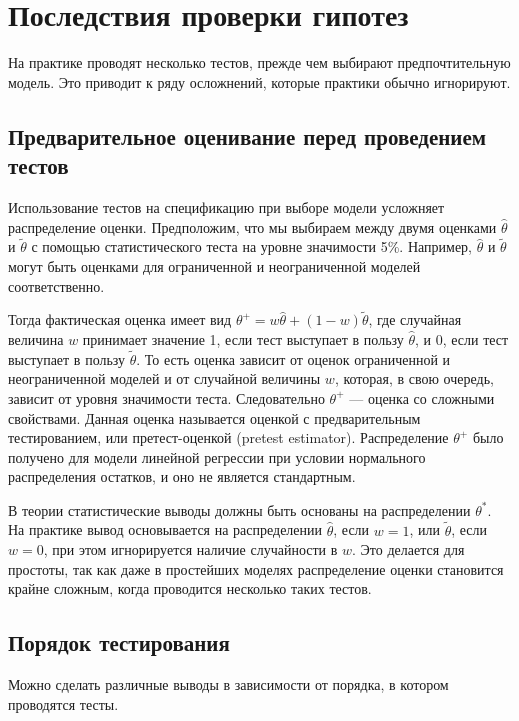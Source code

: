 \section{Последствия проверки гипотез}

На практике проводят несколько тестов, прежде чем выбирают предпочтительную модель. Это приводит к ряду осложнений, которые практики обычно игнорируют.

\subsection{Предварительное оценивание перед проведением тестов}

Использование тестов на спецификацию при выборе модели усложняет распределение оценки. Предположим, что мы выбираем между двумя оценками $\hat{\theta}$ и $\tilde{\theta}$ с помощью статистического теста на уровне значимости 5\%. Например, $\hat{\theta}$ и $\tilde{\theta}$ могут быть оценками для ограниченной и неограниченной моделей соответственно. 

Тогда фактическая оценка имеет вид $\theta^+ = w\hat{\theta} + (1 - w)\tilde{\theta}$, где случайная величина $w$  принимает значение 1, если тест выступает в пользу $\hat{\theta}$, и 0, если тест выступает в пользу $\tilde{\theta}$. То есть оценка зависит от оценок ограниченной и неограниченной моделей и от случайной величины $w$, которая, в свою очередь, зависит от уровня значимости теста. Следовательно $\theta^+$ --- оценка со сложными свойствами. Данная оценка называется оценкой с предварительным тестированием, или претест-оценкой (pretest estimator). Распределение $\theta^+$ было получено для модели линейной регрессии при условии нормального распределения остатков, и оно не является стандартным.

В теории статистические выводы должны быть основаны на распределении $\theta^*$. На практике вывод основывается на распределении $\hat{\theta}$, если $w = 1$, или $\tilde{\theta}$, если $w = 0$, при этом игнорируется наличие случайности в  $w$. Это делается для простоты, так как даже в простейших моделях распределение оценки становится крайне сложным, когда проводится несколько таких тестов.

\subsection{Порядок тестирования}

Можно сделать различные выводы в зависимости от порядка, в котором проводятся тесты.

